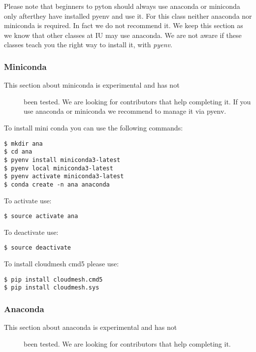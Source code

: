 Please note that beginners to pyton should always use anaconda or
miniconda only afterthey have installed pyenv and use it. For this class
neither anaconda nor miniconda is required. In fact we do not recommend
it. We keep this section as we know that other classes at IU may use
anaconda. We are not aware if these classes teach you the right way to
install it, with \emph{pyenv}.

\subsubsection{Miniconda}\label{miniconda}

\begin{description}
\item[This section about miniconda is experimental and has not]
been tested. We are looking for contributors that help completing it. If
you use anaconda or miniconda we recommend to manage it via pyenv.
\end{description}

To install mini conda you can use the following commands:

\begin{verbatim}
$ mkdir ana
$ cd ana
$ pyenv install miniconda3-latest
$ pyenv local miniconda3-latest
$ pyenv activate miniconda3-latest
$ conda create -n ana anaconda
\end{verbatim}

To activate use:

\begin{verbatim}
$ source activate ana
\end{verbatim}

To deactivate use:

\begin{verbatim}
$ source deactivate
\end{verbatim}

To install cloudmesh cmd5 please use:

\begin{verbatim}
$ pip install cloudmesh.cmd5
$ pip install cloudmesh.sys
\end{verbatim}

\subsubsection{Anaconda}\label{anaconda}

\begin{description}
\item[This section about anaconda is experimental and has not]
been tested. We are looking for contributors that help completing it.
\end{description}

